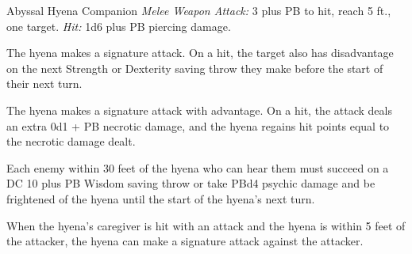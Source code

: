 \documentclass[10pt,a4paper,twoside,bg=print,twocolumn,openany,nodeprecatedcode]{dndbook}
\begin{document}
\begin{DndMonster}[float=t]{Abyssal Hyena Companion}
\DndMonsterBasics[
armor-class = {13 plus PB (natural armor)},
hit-points = {\DndDice{7 + seven times caregiver's level (number of d8 Hit Dice equal to their caregiver's level)}},
speed = {50 ft.}
]
\DndMonsterAbilityScores[
 str = 16,
 dex = 14,
 con = 12,
 int = 5,
 wis = 12,
 cha = 8
]
\DndMonsterDetails[
saving-throws = {Str +3 plus PB, Dex +2 plus PB},
skills = {Perception +1 plus PB},
senses = {darkvision 60 ft., passive perception 11 plus PB},
]
\textsl{Melee Weapon Attack:} 3 plus PB to hit, reach 5 ft., one target. \textsl{Hit:} 1d6 plus PB piercing damage.

The hyena makes a signature attack. On a hit, the target also has disadvantage on the next Strength or Dexterity saving throw they make before the start of their next turn.

The hyena makes a signature attack with advantage. On a hit, the attack deals an extra 0d1 + PB necrotic damage, and the hyena regains hit points equal to the necrotic damage dealt.

Each enemy within 30 feet of the hyena who can hear them must succeed on a DC 10 plus PB Wisdom saving throw or take PBd4 psychic damage and be frightened of the hyena until the start of the hyena's next turn.

When the hyena's caregiver is hit with an attack and the hyena is within 5 feet of the attacker, the hyena can make a signature attack against the attacker.

\end{DndMonster}
\end{document}
